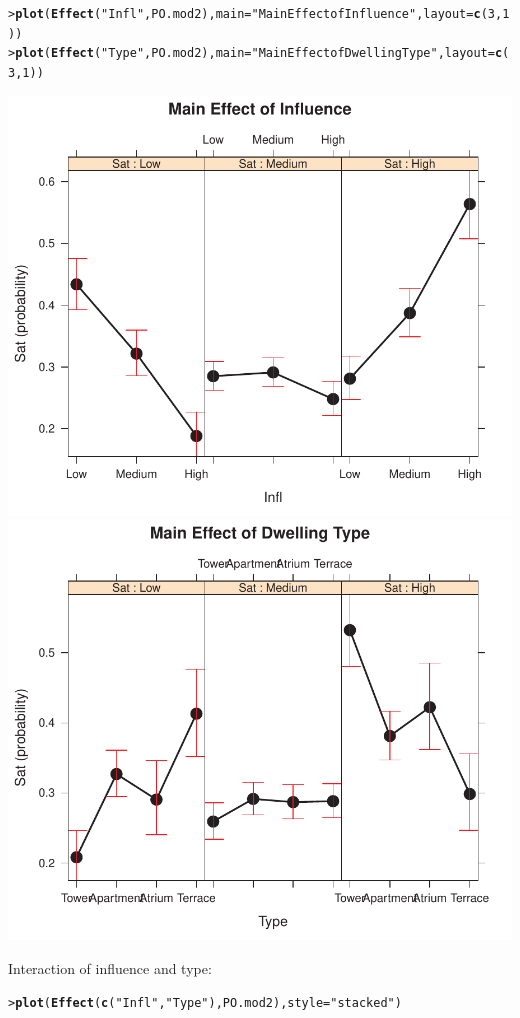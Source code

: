 \documentclass[10pt]{report}\usepackage[]{graphicx}\usepackage[]{color}
\makeatletter
\newcommand{\hlnum}[1]{\textcolor[rgb]{0.686,0.059,0.569}{#1}}%
\newcommand{\hlstr}[1]{\textcolor[rgb]{0.192,0.494,0.8}{#1}}%
\newcommand{\hlstd}[1]{\textcolor[rgb]{0.345,0.345,0.345}{#1}}%
\newcommand{\hlkwc}[1]{\textcolor[rgb]{0.333,0.667,0.333}{#1}}%
\newcommand{\hlkwd}[1]{\textcolor[rgb]{0.737,0.353,0.396}{\textbf{#1}}}%
\newenvironment{kframe}{%
 \def\at@end@of@kframe{}%
 \ifinner\ifhmode%
  \def\at@end@of@kframe{\end{minipage}}%
  \begin{minipage}{\columnwidth}%
 \fi\fi%
 \def\FrameCommand##1{\hskip\@totalleftmargin \hskip-\fboxsep
 \colorbox{shadecolor}{##1}\hskip-\fboxsep
     \hskip-\linewidth \hskip-\@totalleftmargin \hskip\columnwidth}%
 \MakeFramed {\advance\hsize-\width
   \@totalleftmargin\z@ \linewidth\hsize
   \@setminipage}}%
 {\par\unskip\endMakeFramed%
 \at@end@of@kframe}
\newenvironment{knitrout}{}{} %
\renewenvironment{knitrout}{\small\renewcommand{\baselinestretch}{.85}}{} %
\makeatother
\begin{document}
\begin{Exercises}
\begin{enumerate*}
\begin{ans}
\begin{knitrout}\footnotesize
{}\color{fgcolor}\begin{kframe}
\begin{alltt}
\hlstd{> }\hlkwd{plot}\hlstd{(}\hlkwd{Effect}\hlstd{(}\hlstr{"Infl"}\hlstd{, PO.mod2),} \hlkwc{main}\hlstd{=}\hlstr{"Main Effect of Influence"}\hlstd{,} \hlkwc{layout}\hlstd{=}\hlkwd{c}\hlstd{(}\hlnum{3}\hlstd{,}\hlnum{1}\hlstd{))}
\hlstd{> }\hlkwd{plot}\hlstd{(}\hlkwd{Effect}\hlstd{(}\hlstr{"Type"}\hlstd{, PO.mod2),} \hlkwc{main}\hlstd{=}\hlstr{"Main Effect of Dwelling Type"}\hlstd{,} \hlkwc{layout}\hlstd{=}\hlkwd{c}\hlstd{(}\hlnum{3}\hlstd{,}\hlnum{1}\hlstd{))}
\end{alltt}
\end{kframe}

\centerline{\includegraphics[width=.49\textwidth]{soln/fig/ex8_2c4-1} 
\includegraphics[width=.49\textwidth]{soln/fig/ex8_2c4-2} }



\end{knitrout}
    Interaction of influence and type:
\begin{knitrout}\footnotesize
{}\color{fgcolor}\begin{kframe}
\begin{alltt}
\hlstd{> }\hlkwd{plot}\hlstd{(}\hlkwd{Effect}\hlstd{(}\hlkwd{c}\hlstd{(}\hlstr{"Infl"}\hlstd{,}\hlstr{"Type"}\hlstd{), PO.mod2),} \hlkwc{style}\hlstd{=}\hlstr{"stacked"}\hlstd{)}
\end{alltt}
\end{kframe}


\end{knitrout}
\end{ans}
\end{enumerate*}
\end{Exercises}
\end{document}
